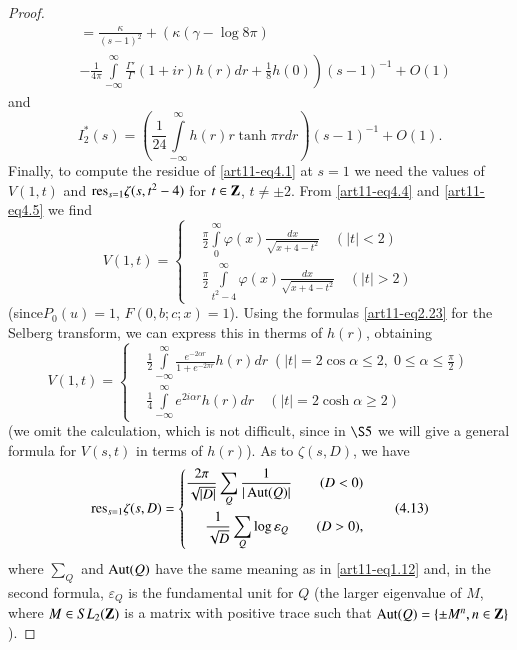 \begin{proof}
\begin{align*}
& = \frac{\kappa}{(s-1)^2} + \left(\kappa (\gamma - \log 8 \pi) \right.\\
&\left. -\frac{1}{4\pi} \int\limits^\infty_{-\infty} \frac{\Gamma'}{\Gamma} (1 + ir) h (r) dr + \frac{1}{8} h (0) \right) (s-1)^{-1} + O(1)
\end{align*}
and 
$$
I^\ast_2(s) = \left(\frac{1}{24} \int\limits^\infty_{-\infty} h(r) r \tanh \pi r dr \right) (s-1)^{-1} + O(1). 
$$
Finally, to compute the residue of \eqref{art11-eq4.1} at $s=1$ we need the values of $V(1,t)$ and $\mathrm{res}_{s=1} \zeta(s,t^2 -4)$ for $t \in \mathbf{Z}$, $t \neq \pm 2$. From \eqref{art11-eq4.4} and \eqref{art11-eq4.5} we find 
$$
V(1,t) =
\left\{ 
\begin{aligned}
& \frac{\pi}{2} \int\limits^\infty_0 \varphi (x) \frac{dx}{\sqrt{x+ 4 -t^2}} \quad (|t|<2)\\
& \frac{\pi}{2} \int\limits^\infty_{t^2 -4} \varphi (x) \frac{dx}{ \sqrt{x + 4 -t^2}} \quad (|t|>2)
\end{aligned}
\right.
$$
(since\pageoriginale $P_0 (u) =1$, $F(0, b; c; x) =1$). Using the formulas \eqref{art11-eq2.23} for the Selberg transform, we can express this in therms of $h(r)$, obtaining 
\begin{equation*}
V(1,t) = 
\left\{ 
\begin{aligned}
& \frac{1}{2} \int\limits^\infty_{-\infty} \frac{e^{-2 \alpha r}}{1+e^{-2\pi r}}  h(r)dr \; (|t| = 2 \cos \alpha \leqslant 2, \; 0\leqslant \alpha \leqslant \frac{\pi}{2})\\
& \frac{1}{4} \int\limits^\infty_{-\infty} e^{2 i \alpha r} h(r) dr \quad (|t| = 2 \cosh \alpha \geqslant 2)
\end{aligned}
\right.
\tag{4.12}\label{art11-eq4.12}
\end{equation*}
(we omit the calculation, which is not difficult, since in $\S 5$ we will give a general formula for $V (s,t)$ in terms of $h(r)$). As to $\zeta (s,D)$, we have 
\begin{equation*}
\mathrm{res}_{s =1} \zeta (s, D) =
\left\{
\begin{aligned}
\frac{2\pi}{\sqrt{|D|}} \sum\limits_Q \frac{1}{|\operatorname{Aut} (Q)|} \qquad (D<0)\\
\frac{1}{\sqrt{D}} \sum\limits_Q \log \varepsilon_Q \qquad (D > 0), 
\end{aligned}
\right.\tag{4.13}\label{art11-eq4.13}
\end{equation*}
where $\sum\limits_Q$ and $\operatorname{Aut} (Q)$ have the same meaning as in \eqref{art11-eq1.12} and, in the second formula, $\varepsilon_Q$ is the fundamental unit for $Q$ (\ie the larger eigenvalue of $M$, where $M \in SL_2 (\mathbf{Z})$ is a matrix with positive trace such that $\operatorname{Aut} (Q) = \{\pm M^n, n \in \mathbf{Z}\}$).


\end{proof}
